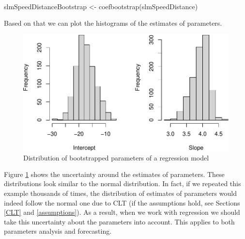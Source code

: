 \documentclass[
]{book}
\newenvironment{Shaded}{\begin{snugshade}}{\end{snugshade}}
\newcommand{\AttributeTok}[1]{\textcolor[rgb]{0.77,0.63,0.00}{#1}}
\newcommand{\DecValTok}[1]{\textcolor[rgb]{0.00,0.00,0.81}{#1}}
\newcommand{\FunctionTok}[1]{\textcolor[rgb]{0.00,0.00,0.00}{#1}}
\newcommand{\NormalTok}[1]{#1}
\newcommand{\OtherTok}[1]{\textcolor[rgb]{0.56,0.35,0.01}{#1}}
\newcommand{\SpecialCharTok}[1]{\textcolor[rgb]{0.00,0.00,0.00}{#1}}
\newcommand{\StringTok}[1]{\textcolor[rgb]{0.31,0.60,0.02}{#1}}
\theoremstyle{definition}
\theoremstyle{definition}
\theoremstyle{definition}
\theoremstyle{definition}
\theoremstyle{remark}
\begin{document}
\begin{Shaded}
\begin{Highlighting}[]
\NormalTok{slmSpeedDistanceBootstrap }\OtherTok{\textless{}{-}} \FunctionTok{coefbootstrap}\NormalTok{(slmSpeedDistance)}
\end{Highlighting}
\end{Shaded}

Based on that we can plot the histograms of the estimates of parameters.

\begin{Shaded}
\end{Shaded}

\begin{figure}
\centering
\includegraphics{Svetunkov---Statistics-for-Business-Analytics_files/figure-latex/slmSpeedDistanceBoot-1.pdf}
\caption{\label{fig:slmSpeedDistanceBoot}Distribution of bootstrapped parameters of a regression model}
\end{figure}

Figure \ref{fig:slmSpeedDistanceBoot} shows the uncertainty around the estimates of parameters. These distributions look similar to the normal distribution. In fact, if we repeated this example thousands of times, the distribution of estimates of parameters would indeed follow the normal one due to CLT (if the assumptions hold, see Sections \ref{CLT} and \ref{assumptions}). As a result, when we work with regression we should take this uncertainty about the parameters into account. This applies to both parameters analysis and forecasting.
\end{document}
